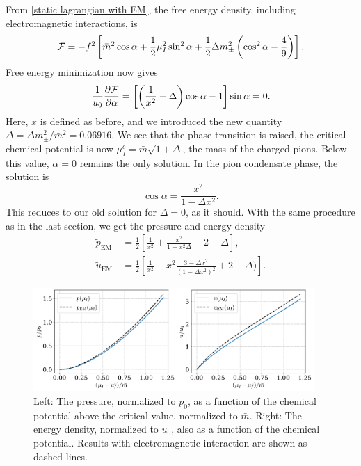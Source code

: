 From \autoref{static lagrangian with EM}, the free energy density, including electromagnetic interactions, is
%
\begin{equation}
    \mathcal{F} =
    - f^2 \left[
        \bar m^2 \cos \alpha 
        + \frac{1}{2} \mu_I^2 \sin^2 \alpha
        + \frac{1}{2} \Delta m_\pm^2 \left(\cos^2 \alpha - \frac{4}{9}\right)
    \right],
\end{equation}
%
Free energy minimization now gives
%
\begin{equation}
    \frac{1}{u_0}\pdv{\mathcal{F}}{\alpha}
    = 
    \left[ \left( \frac{1}{x^2} - \Delta \right) \cos \alpha - 1\right] \sin \alpha = 0.
\end{equation}
%
Here, $x$ is defined as before, and we introduced the new quantity $\Delta = \Delta m_{\pm}^2 / \bar m^2= 0.06916$.
We see that the phase transition is raised, the critical chemical potential is now $\mu_I^c = \bar m \sqrt{1 + \Delta}$, the mass of the charged pions.
Below this value, $\alpha = 0$ remains the only solution.
In the pion condensate phase, the solution is
%
\begin{equation}
    \cos \alpha = \frac{x^2}{1 - \Delta x^2}.
\end{equation}
%
This reduces to our old solution for $\Delta = 0$, as it should.
With the same procedure as in the last section, we get the pressure and energy density
%
\begin{align}
    \tilde p_\text{EM} \
    & = \frac{1}{2} 
    \left[
        \frac{1}{x^2} 
        + \frac{x^2}{1 - x^2 \Delta} 
        - 2 - \Delta
    \right], \\
    \tilde u_\text{EM}
    &= \frac{1}{2} 
    \left[
        \frac{1}{x^2} 
        - x^2 \frac{3 - \Delta x^2}{(1 - \Delta x^2)^2}
        + 2 + \Delta)
    \right].
\end{align}
%

\begin{figure}[!htb]
    \centering
    \includegraphics[width=0.95\textwidth]{../scripts/figurer/pion_star/pion_up.pdf}
    \caption{
        Left: The pressure, normalized to $p_0$, as a function of the chemical potential above the critical value, normalized to $\bar m$.
        Right: The energy density, normalized to $u_0$, also as a function of the chemical potential.
        Results with electromagnetic interaction are shown as dashed lines.
        }
        \label{fig: pressure and energy with EM interaction}
\end{figure}



